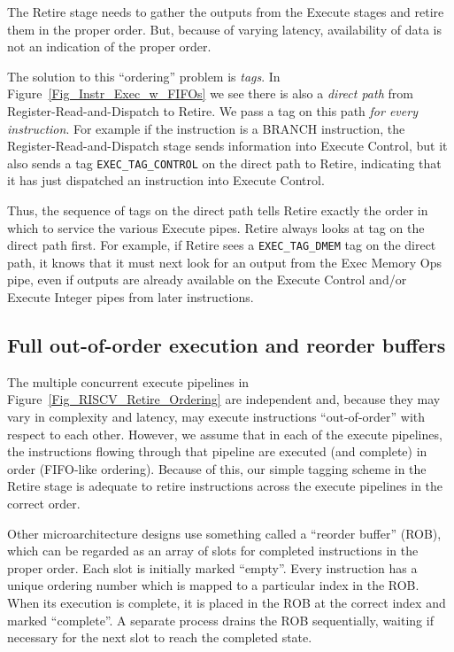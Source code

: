 The Retire stage needs to gather the outputs from the Execute stages
and retire them in the proper order.  But, because of varying latency,
availability of data is not an indication of the proper order.

The solution to this ``ordering'' problem is \emph{tags}.  In
Figure~\ref{Fig_Instr_Exec_w_FIFOs} we see there is also a
\emph{direct path} from Register-Read-and-Dispatch to Retire.  We pass
a tag on this path \emph{for every instruction}.  For example if the
instruction is a BRANCH instruction, the Register-Read-and-Dispatch
stage sends information into Execute Control, but it also sends a tag
\verb|EXEC_TAG_CONTROL| on the direct path to Retire, indicating that
it has just dispatched an instruction into Execute Control.

Thus, the sequence of tags on the direct path tells Retire exactly the
order in which to service the various Execute pipes.  Retire always
looks at tag on the direct path first.  For example, if Retire sees a
\verb|EXEC_TAG_DMEM| tag on the direct path, it knows that it must
next look for an output from the Exec Memory Ops pipe, even if outputs
are already available on the Execute Control and/or Execute Integer
pipes from later instructions.


\subsection{Full out-of-order execution and reorder buffers}


The multiple concurrent execute pipelines in
Figure~\ref{Fig_RISCV_Retire_Ordering} are independent and, because
they may vary in complexity and latency, may execute instructions
``out-of-order'' with respect to each other.  However, we assume that
in each of the execute pipelines, the instructions flowing through
that pipeline are executed (and complete) in order (FIFO-like
ordering).  Because of this, our simple tagging scheme in the Retire
stage is adequate to retire instructions across the execute pipelines
in the correct order.

Other microarchitecture designs use something called a ``reorder
buffer'' (ROB), which can be regarded as an array of slots for
completed instructions in the proper order.  Each slot is initially
marked ``empty''.  Every instruction has a unique ordering number
which is mapped to a particular index in the ROB.  When its execution
is complete, it is placed in the ROB at the correct index and marked
``complete''.  A separate process drains the ROB sequentially, waiting
if necessary for the next slot to reach the completed state.

